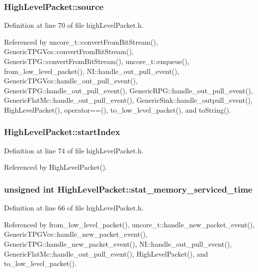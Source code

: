 \subsubsection[{source}]{ {\bf HighLevelPacket::source}}\label{classHighLevelPacket_d09485039d19ea9f0f58697e9fdf6450}




Definition at line 70 of file highLevelPacket.h.

Referenced by uncore\_\-t::convertFromBitStream(), GenericTPGVcs::convertFromBitStream(), GenericTPG::convertFromBitStream(), uncore\_\-t::enqueue(), from\_\-low\_\-level\_\-packet(), NI::handle\_\-out\_\-pull\_\-event(), GenericTPGVcs::handle\_\-out\_\-pull\_\-event(), GenericTPG::handle\_\-out\_\-pull\_\-event(), GenericRPG::handle\_\-out\_\-pull\_\-event(), GenericFlatMc::handle\_\-out\_\-pull\_\-event(), GenericSink::handle\_\-outpull\_\-event(), HighLevelPacket(), operator==(), to\_\-low\_\-level\_\-packet(), and toString().
\subsubsection[{startIndex}]{ {\bf HighLevelPacket::startIndex}}\label{classHighLevelPacket_ec807a7bab73b8adc80d3a3df586a47d}




Definition at line 74 of file highLevelPacket.h.

Referenced by HighLevelPacket().
\subsubsection[{stat\_\-memory\_\-serviced\_\-time}]{\setlength{\rightskip}{0pt plus 5cm}unsigned int {\bf HighLevelPacket::stat\_\-memory\_\-serviced\_\-time}}\label{classHighLevelPacket_9b5cf0352fb4890ab094d21de459474a}




Definition at line 66 of file highLevelPacket.h.

Referenced by from\_\-low\_\-level\_\-packet(), uncore\_\-t::handle\_\-new\_\-packet\_\-event(), GenericTPGVcs::handle\_\-new\_\-packet\_\-event(), GenericTPG::handle\_\-new\_\-packet\_\-event(), NI::handle\_\-out\_\-pull\_\-event(), GenericFlatMc::handle\_\-out\_\-pull\_\-event(), HighLevelPacket(), and to\_\-low\_\-level\_\-packet().
